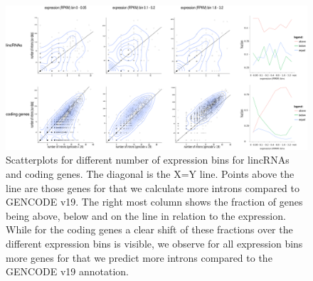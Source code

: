 \documentclass[ncrna,article,submit,moreauthors,pdftex,10pt,a4paper]{mdpi}
\begin{document}
\begin{figure}[h]
 \centering
 \includegraphics[height = 10 cm, width=\linewidth]{Fig1.pdf}
 \caption{Scatterplots for different number of expression bins for lincRNAs and coding genes. 
The diagonal is the X=Y line. Points above the line are those genes for that we calculate more introns compared to GENCODE v19.
The right most column shows the fraction of genes being above, below and on the line  in relation to the expression.
While for the coding genes a clear shift of these fractions over the different expression bins is visible, we observe for all expression bins more genes for that we predict more introns compared to the GENCODE v19 annotation.}
 \label{scatter}
\end{figure}
\end{document}

